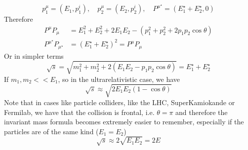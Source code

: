 \documentclass[../admech.tex]{subfiles}
\begin{document}
\begin{equation}
	p^\mu_1=\left( E_1,p_1^i \right),\quad p^\mu_2=\left( E_2,p_2^i \right),\quad P^{\mu^\star}=\left( E_1^\star+E_2^\star,0 \right)
	\label{eq:frontalcollisionrel}
\end{equation}
Therefore
\begin{equation*}
	\begin{aligned}
		P^\mu P_\mu&=E_1^2+E_2^2+2E_1E_2-\left( p_1^2+p_2^2+2p_1p_2\cos\theta \right)\\
		P^{\mu^\star}P_{\mu^\star}&=\left( E_1^\star+E_2^\star \right)^2=P^\mu P_\mu
	\end{aligned}
\end{equation*}
Or in simpler terms
\begin{equation}
	\sqrt{s}=\sqrt{m_1^2+m_2^2+2\left( E_1E_2-p_1p_2\cos\theta \right)}=E_1^\star+E_2^\star
	\label{eq:invmassfrontalcollision}
\end{equation}
If $m_1,m_2<<E_1$, so in the ultrarelativistic case, we have
\begin{equation}
	\sqrt{s}\approx\sqrt{2E_1E_2\left( 1-\cos\theta \right)}
	\label{eq:invmassfrontalcollisionatalmostc}
\end{equation}
Note that in cases like particle colliders, like the LHC, SuperKamiokande or Fermilab, we have that the collision is frontal, i.e. $\theta=\pi$ and therefore the invariant mass formula becomes extremely easier to remember, especially if the particles are of the same kind ($E_1=E_2$)
\begin{equation}
	\sqrt{s}\approx2\sqrt{E_1E_2}=2E
	\label{eq:invmassLHC}
\end{equation}
\end{document}
